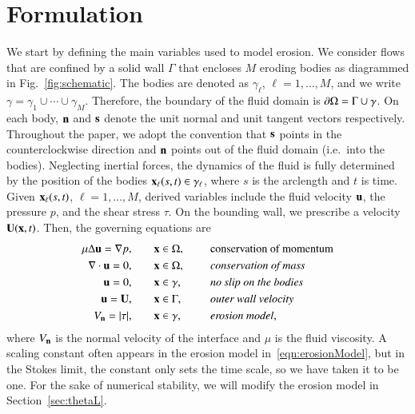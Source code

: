 \documentclass[preprint, 10pt]{elsarticle}
\begin{document}
\section{Formulation}
\label{s:formulation}
We start by defining the main variables used to model erosion.  We consider flows that are confined by a solid wall $\Gamma$ that encloses $M$ eroding bodies as diagrammed in Fig.~\ref{fig:schematic}.  The bodies are denoted as $\gamma_\ell$, $\ell=1,\ldots,M$, and we write $\gamma = \gamma_1 \cup \cdots \cup \gamma_M$.  Therefore, the boundary of the fluid domain is $\bd\Omega = \Gamma \cup \gamma$. On each body, $\nn$ and $\ss$ denote the unit normal and unit tangent vectors respectively.  Throughout the paper, we adopt the convention that $\ss$ points in the counterclockwise direction and $\nn$ points out of the fluid domain (i.e.~into the bodies). Neglecting inertial forces, the dynamics of the fluid is fully determined by the position of the bodies $\xx_\ell(s,t) \in \gamma_\ell$, where $s$ is the arclength and $t$ is time.  Given $\xx_\ell(s,t)$, $\ell=1,\ldots,M$, derived variables include the fluid velocity $\uu$, the pressure $p$, and the shear stress $\tau$.   On the bounding wall, we prescribe a velocity $\UU(\xx,t)$.  Then, the governing equations are
\begin{equation}
\label{eqn:erosionModel}
\begin{split}
  \mu \Delta \uu = \grad p, &\hspace{20pt} \xx \in \Omega, \gap &&\mbox{conservation
of momentum}\\
\grad \cdot \uu = 0, &\hspace{20pt} \xx \in \Omega, \gap &&\mbox{\em conservation of mass} \\
\uu = 0, &\hspace{20pt} \xx \in \gamma, \gap &&\mbox{\em no slip on the
bodies} \\
\uu = \UU, &\hspace{20pt} \xx \in \Gamma, \gap &&\mbox{\em outer wall
velocity} \\
\Vn = \abs{\tau}, &\hspace{20pt} \xx \in \gamma,
&&\mbox{\em erosion model},
\end{split}
\end{equation}
where $\Vn$ is the normal velocity of the interface and $\mu$ is the fluid viscosity.  A scaling constant often appears in the erosion model in~\eqref{eqn:erosionModel}, but in the Stokes limit, the constant only sets the time scale, so we have taken it to be one.  For the sake of numerical stability, we will modify the erosion model in Section~\ref{sec:thetaL}. 
\end{document}
